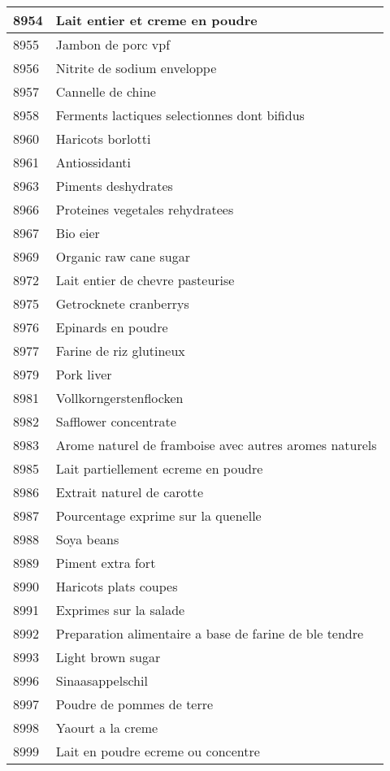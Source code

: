 \begin{longtable}{|l|l|}
8954 & Lait entier et creme en poudre \\ \hline 
8955 & Jambon de porc vpf \\ \hline 
8956 & Nitrite de sodium enveloppe \\ \hline 
8957 & Cannelle de chine \\ \hline 
8958 & Ferments lactiques selectionnes dont bifidus \\ \hline 
8960 & Haricots borlotti \\ \hline 
8961 & Antiossidanti \\ \hline 
8963 & Piments deshydrates \\ \hline 
8966 & Proteines vegetales rehydratees \\ \hline 
8967 & Bio eier \\ \hline 
8969 & Organic raw cane sugar \\ \hline 
8972 & Lait entier de chevre pasteurise \\ \hline 
8975 & Getrocknete cranberrys \\ \hline 
8976 & Epinards en poudre \\ \hline 
8977 & Farine de riz glutineux \\ \hline 
8979 & Pork liver \\ \hline 
8981 & Vollkorngerstenflocken \\ \hline 
8982 & Safflower concentrate \\ \hline 
8983 & Arome naturel de framboise avec autres aromes naturels \\ \hline 
8985 & Lait partiellement ecreme en poudre \\ \hline 
8986 & Extrait naturel de carotte \\ \hline 
8987 & Pourcentage exprime sur la quenelle \\ \hline 
8988 & Soya beans \\ \hline 
8989 & Piment extra fort \\ \hline 
8990 & Haricots plats coupes \\ \hline 
8991 & Exprimes sur la salade \\ \hline 
8992 & Preparation alimentaire a base de farine de ble tendre \\ \hline 
8993 & Light brown sugar \\ \hline 
8996 & Sinaasappelschil \\ \hline 
8997 & Poudre de pommes de terre \\ \hline 
8998 & Yaourt a la creme \\ \hline 
8999 & Lait en poudre ecreme ou concentre \\ \hline 

\end{longtable}

